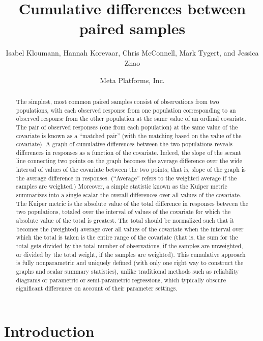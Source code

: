 \documentclass{article}
\title{Cumulative differences between paired samples}
\author{Isabel Kloumann, Hannah Korevaar, Chris McConnell, Mark Tygert,
        and Jessica Zhao}
\date{Meta Platforms, Inc.}
\begin{document}
\maketitle



\begin{abstract}
The simplest, most common paired samples consist of observations
from two populations, with each observed response from one population
corresponding to an observed response from the other population
at the same value of an ordinal covariate.
The pair of observed responses (one from each population)
at the same value of the covariate is known as a ``matched pair''
(with the matching based on the value of the covariate).
A graph of cumulative differences between the two populations
reveals differences in responses as a function of the covariate.
Indeed, the slope of the secant line connecting two points on the graph
becomes the average difference over the wide interval of values
of the covariate between the two points; that is, slope of the graph
is the average difference in responses.
(``Average'' refers to the weighted average if the samples are weighted.)
Moreover, a simple statistic known as the Kuiper metric summarizes
into a single scalar the overall differences over all values of the covariate.
The Kuiper metric is the absolute value of the total difference in responses
between the two populations, totaled over the interval of values
of the covariate for which the absolute value of the total is greatest.
The total should be normalized such that it becomes the (weighted) average
over all values of the covariate when the interval over which the total
is taken is the entire range of the covariate (that is,
the sum for the total gets divided by the total number of observations,
if the samples are unweighted, or divided by the total weight,
if the samples are weighted).
This cumulative approach is fully nonparametric and uniquely defined (with only
one right way to construct the graphs and scalar summary statistics),
unlike traditional methods such as reliability diagrams or parametric
or semi-parametric regressions, which typically obscure significant differences
on account of their parameter settings.
\end{abstract}



\section{Introduction}
\label{intro}
\end{document}
